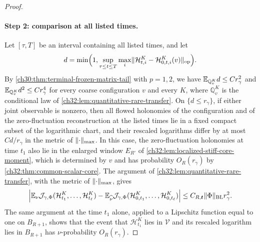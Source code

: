 \begin{proof}
\paragraph{Step 2: comparison at all listed times.}
Let $[\tau,T]$ be an interval containing all listed times, and let
\[
 d=\min\Bigl(1,\sup_{\tau\le t\le T}\max_i\lVert \mathcal H^K_{t,i}-\mathcal H^K_{0,t,i}(v)\rVert_{\mathrm{op}}\Bigr).
\]
By \cref{ch30:thm:terminal-frozen-matrix-tail} with $p=1,2$, we have $\mathbb E_{\mathbb Q^K_v}d\le Cr_\gamma^2$ and $\mathbb E_{\mathbb Q^K_v}d^2\le Cr_\gamma^4$ for every coarse configuration $v$ and every $K$, where $\mathbb Q^K_v$ is the conditional law of \cref{ch32:lem:quantitative-rare-transfer}. On $\{d\le r_\gamma\}$, if either joint observable is nonzero, then all flowed holonomies of the configuration and of the zero-fluctuation reconstruction at the listed times lie in a fixed compact subset of the logarithmic chart, and their rescaled logarithms differ by at most $Cd/r_\gamma$ in the metric of $\lVert \cdot\rVert_{\max}$. In this case, the zero-fluctuation holonomies at time $t_1$ also lie in the enlarged window $E_{R'}$ of \cref{ch32:lem:localized-stiff-core-moment}, which is determined by $v$ and has probability $O_R(r_\gamma)$ by \cref{ch32:thm:common-scalar-core}. The argument of \cref{ch32:lem:quantitative-rare-transfer}, with the metric of $\lVert \cdot\rVert_{\max}$, gives
\begin{equation}\label{ch32:eq:finite-joint-transfer}
 \Bigl\lvert\mathbb E_\nu\mathcal J_{\gamma,\Phi}(\mathcal H^K_{t_1},\dots,\mathcal H^K_{t_\ell})-\mathbb E_{\widehat\nu}\mathcal J_{\gamma,\Phi}(\mathcal H^K_{0,t_1},\dots,\mathcal H^K_{0,t_\ell})\Bigr\rvert\le C_{R,\boldsymbol t}\lVert \Phi\rVert_{\mathrm{BL}}r_\gamma^2.
\end{equation}
The same argument at the time $t_1$ alone, applied to a Lipschitz function equal to one on $B_{R+1}$, shows that the event that $\mathcal H^K_{t_1}$ lies in $\mathcal V$ and its rescaled logarithm lies in $B_{R+1}$ has $\nu$-probability $O_R(r_\gamma)$.


\end{proof}
